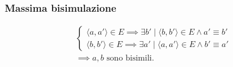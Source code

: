 \documentclass{beamer}
\begin{document}
\begin{frame}
    \frametitle{Massima bisimulazione}
    \begin{gather*}
        \begin{cases}
            \langle a, a' \rangle \in E \implies \exists b' \mid \langle b, b' \rangle \in E \land a' \equiv b'\\
            \langle b, b' \rangle \in E \implies \exists a' \mid \langle a, a' \rangle \in E \land b' \equiv a'
        \end{cases}\\
        \implies a,b \text{ sono bisimili.}
    \end{gather*}

    \begin{figure}
    \end{figure}
\end{frame}
\end{document}
